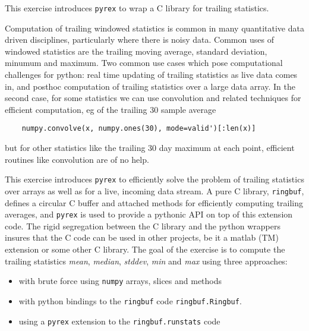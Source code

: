 This exercise introduces \texttt{pyrex} to wrap a C library for
trailing statistics.

Computation of trailing windowed statistics is common in many
quantitative data driven disciplines, particularly where there is
noisy data.  Common uses of windowed statistics are the trailing
moving average, standard deviation, minumum and maximum.  Two common
use cases which pose computational challenges for python: real time
updating of trailing statistics as live data comes in, and posthoc
computation of trailing statistics over a large data array.  In the
second case, for some statistics we can use convolution and related
techniques for efficient computation, eg of the trailing 30 sample
average

\begin{lstlisting}
    numpy.convolve(x, numpy.ones(30), mode=valid')[:len(x)]
\end{lstlisting}

but for other statistics like the trailing 30 day maximum at each
point, efficient routines like convolution are of no help.

This exercise introduces \texttt{pyrex} to efficiently solve the problem of
trailing statistics over arrays as well as for a live, incoming data
stream. A pure C library, \texttt{ringbuf}, defines a circular C
buffer and attached methods for efficiently computing trailing
averages, and \texttt{pyrex} is used to provide a pythonic API on top of this
extension code.  The rigid segregation between the C library and the
python wrappers insures that the C code can be used in other projects,
be it a matlab (TM) extension or some other C library.  The goal of
the exercise is to compute the trailing statistics \textit{mean},
\textit{median}, \textit{stddev}, \textit{min} and \textit{max} using
three approaches:

\begin{itemize}
  \item with brute force using \texttt{numpy} arrays, slices and methods

  \item with python bindings to the \texttt{ringbuf} code
    \texttt{ringbuf.Ringbuf}.

  \item using a \texttt{pyrex} extension to the
    \texttt{ringbuf.runstats} code

\end{itemize}

